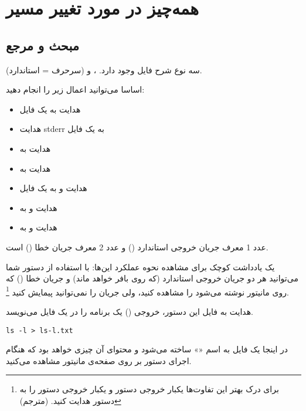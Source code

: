 \chapter{همه‌چیز در مورد تغییر مسیر}
\section*{مبحث و مرجع}
سه نوع شرح فایل وجود دارد‌.
‏،  و 
(سرحرف  = استاندارد).

اساسا می‌توانید‌ اعمال زیر را انجام دهید:
\begin{itemize}
\item{
هدایت  به یک فایل
}

\item{
هدایت stderr به یک فایل
}

\item{
هدایت  به 
}

\item{
هدایت  به 
}

\item{
هدایت  و  به یک فایل
}

\item{
هدایت  و  به 
}

\item{
هدایت  و  به 
}
\end{itemize}

عدد 1 معرف جریان خروجی استاندارد () و عدد 2 معرف جریان خطا () است.

یک یادداشت کوچک برای مشاهده نحوه عملکرد این‌ها‌: با استفاده از دستور  شما می‌توانید
هر دو جریان خروجی استاندارد  (که روی بافر خواهد ماند‌) و جریان خطا ()
که روی مانیتور نوشته می‌شود را مشاهده کنید‌، ولی جریان  را نمی‌توانید پیمایش
کنید
\footnote{
برای درک بهتر این تفاوت‌ها یکبار خروجی دستور
 و یکبار خروجی دستور
 را به دستور
  هدایت کنید. (مترجم)
}.

\begin{example}{هدایت  به فایل}
این دستور، خروجی () یک برنامه را در یک فایل می‌نویسد‌.

\begin{latin}
\begin{lstlisting}
ls -l > ls-l.txt
\end{lstlisting}
\end{latin}

در اینجا یک فایل به اسم «‌‌» ساخته می‌شود و محتوای آن چیزی خواهد بود که
هنگام اجرای دستور  بر روی صفحه‌ی مانیتور مشاهده می‌کنید‌.
\end{example}

